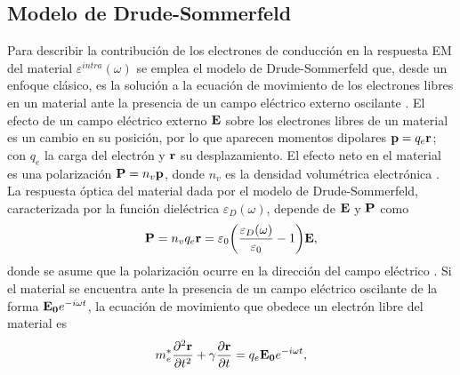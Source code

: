 \subsection{Modelo de Drude-Sommerfeld}
\label{ssection:Drude}

 Para describir la contribución de los electrones de conducción en la respuesta EM del material $\varepsilon^{intra}(\omega)$ se emplea el modelo de Drude-Sommerfeld que, desde un enfoque clásico, es la solución a la ecuación de movimiento de los electrones libres en un material ante la presencia de un campo eléctrico externo oscilante \cite{gross2014festkorperphysik}. El efecto de un campo eléctrico externo $\vb{E}$ sobre los electrones libres de un material es un cambio en su posición, por lo que aparecen momentos dipolares $\vb{p}=q_e\vb{r}$; con $q_e$ la carga del electrón y $\vb{r}$ su desplazamiento.  El efecto neto en el material es una polarización $\vb{P} = n_v \vb{p}$, donde $n_v$ es la densidad volumétrica electrónica \cite{novotny2006principles}.  La respuesta óptica del material dada por el modelo de Drude-Sommerfeld, caracterizada por la función dieléctrica $\varepsilon_D(\omega)$, depende de $\vb{E}$ y $\vb{P}$ como 
%
	\begin{align}
	\vb{P} = n_v q_e \vb{r} =\varepsilon_0\qty(\frac{\varepsilon_D(\omega)}{\varepsilon_0}-1)\vb{E},
	\label{eq:PolarizationDrude}
	\end{align}
%
donde se asume que la polarización ocurre en la dirección del campo eléctrico \cite{novotny2006principles}. Si el material se encuentra ante la presencia de un campo eléctrico oscilante de la forma $\vb{E_0} e^{-i\omega t}$, la ecuación de movimiento que obedece un electrón libre del material es \cite{kreibig1995clusters,gross2014festkorperphysik}
%
	\begin{align}
	m_e^* \pdv[2]{\vb{r}}{t} +  \gamma \pdv{\vb{r}}{t} = q_e\vb{E_0}e^{-i\omega t},
	\label{eq:movementDrude}
	\end{align}
%
